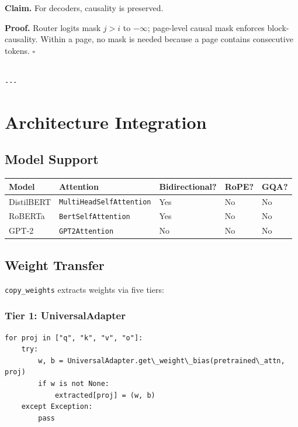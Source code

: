 \textbf{Claim.} For decoders, causality is preserved.

\textbf{Proof.} Router logits mask $j > i$ to $-\infty$; page-level causal mask 
enforces block-causality. Within a page, no mask is needed because a page 
contains consecutive tokens. $\square$
\begin{lstlisting}

---
\end{lstlisting}

\section{Architecture Integration}

\subsection{Model Support}

\begin{table}[H]
\centering
\small
\begin{tabular}{lllll}
\toprule
\textbf{Model} & \textbf{Attention} & \textbf{Bidirectional?} & \textbf{RoPE?} & \textbf{GQA?} \\
\midrule
DistilBERT & \texttt{MultiHeadSelfAttention} & Yes & No & No \\
RoBERTa & \texttt{BertSelfAttention} & Yes & No & No \\
GPT-2 & \texttt{GPT2Attention} & No & No & No \\
\bottomrule
\end{tabular}
\end{table}

\subsection{Weight Transfer}

\texttt{copy\_weights} extracts weights via five tiers:

\subsubsection{Tier 1: UniversalAdapter}

\begin{lstlisting}
for proj in ["q", "k", "v", "o"]:
    try:
        w, b = UniversalAdapter.get\_weight\_bias(pretrained\_attn, proj)
        if w is not None:
            extracted[proj] = (w, b)
    except Exception:
        pass
\end{lstlisting}

